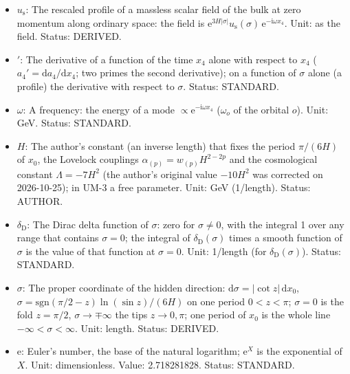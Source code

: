 \documentclass[
  10pt,
]{article}
\providecommand{\tightlist}{%
  \setlength{\itemsep}{0pt}\setlength{\parskip}{0pt}}
\begin{document}
\begin{itemize}
\tightlist
\item
  \(u_{\mathrm{s}}\): The rescaled profile of a massless scalar field of
  the bulk at zero momentum along ordinary space: the field is
  \(\mathrm{e}^{3H\lvert\sigma\rvert}u_{\mathrm{s}}(\sigma)\,\mathrm{e}^{-\mathrm{i}\omega x_4}\).
  Unit: as the field. Status: DERIVED.
\item
  \({}'\): The derivative of a function of the time \(x_4\) alone with
  respect to \(x_4\) (\(a_4' = \mathrm{d}a_4/\mathrm{d}x_4\); two primes
  the second derivative); on a function of \(\sigma\) alone (a profile)
  the derivative with respect to \(\sigma\). Status: STANDARD.
\item
  \(\omega\): A frequency: the energy of a mode
  \(\propto \mathrm{e}^{-\mathrm{i}\omega x_4}\) (\(\omega_o\) of the
  orbital \(o\)). Unit: GeV. Status: STANDARD.
\item
  \(H\): The author's constant (an inverse length) that fixes the period
  \(\pi/(6H)\) of \(x_0\), the Lovelock couplings
  \(\alpha_{(p)} = w_{(p)}H^{2-2p}\) and the cosmological constant
  \(\Lambda = -7H^2\) (the author's original value \(-10H^2\) was
  corrected on 2026-10-25); in UM-3 a free parameter. Unit: GeV
  (1/length). Status: AUTHOR.
\item
  \(\delta_{\mathrm{D}}\): The Dirac delta function of \(\sigma\): zero
  for \(\sigma \ne 0\), with the integral 1 over any range that contains
  \(\sigma = 0\); the integral of \(\delta_{\mathrm{D}}(\sigma)\) times
  a smooth function of \(\sigma\) is the value of that function at
  \(\sigma = 0\). Unit: 1/length (for \(\delta_{\mathrm{D}}(\sigma)\)).
  Status: STANDARD.
\item
  \(\sigma\): The proper coordinate of the hidden direction:
  \(\mathrm{d}\sigma = \lvert\cot z\rvert\,\mathrm{d}x_0\),
  \(\sigma = \mathrm{sgn}(\pi/2 - z)\ln(\sin z)/(6H)\) on one period
  \(0 < z < \pi\); \(\sigma = 0\) is the fold \(z = \pi/2\),
  \(\sigma \to \mp\infty\) the tips \(z \to 0, \pi\); one period of
  \(x_0\) is the whole line \(-\infty < \sigma < \infty\). Unit: length.
  Status: DERIVED.
\item
  \(\mathrm{e}\): Euler's number, the base of the natural logarithm;
  \(\mathrm{e}^{X}\) is the exponential of \(X\). Unit: dimensionless.
  Value: 2.718281828. Status: STANDARD.
\end{itemize}
\end{document}
